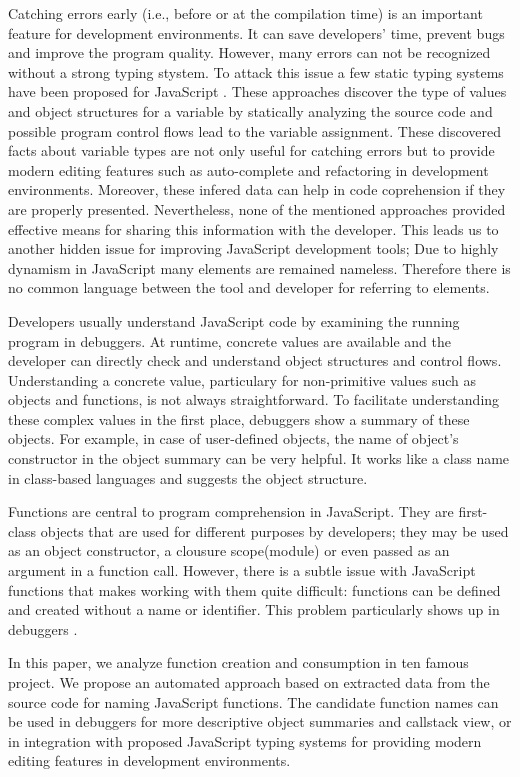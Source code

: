 \documentclass[10pt, preprint]{sigplanconf}
\begin{document}
Catching errors early (i.e., before or at the compilation time) is an important feature for development environments. It can save developers' time, prevent bugs and improve the program quality. However, many errors can not be recognized without a strong typing stystem. To attack this issue a few static typing systems have been proposed for JavaScript \cite{Anderson, Anderson2, Heidegger, Thiemann}. These approaches discover the type of values and object structures for a variable by statically analyzing the source code and possible program control flows lead to the variable assignment. These discovered facts about variable types are not only useful for catching errors but to provide modern editing features such as auto-complete and refactoring in development environments. Moreover, these infered data can help in code coprehension if they are properly presented. Nevertheless, none of the mentioned approaches provided effective means for sharing this information with the developer. This leads us to another hidden issue for improving JavaScript development tools; Due to highly dynamism in JavaScript many elements are remained nameless. Therefore there is no common language between the tool and developer for referring to elements.

Developers usually understand JavaScript code by examining the running program in debuggers. At runtime, concrete values are available and the developer can directly check and understand object structures and control flows. Understanding a concrete value, particulary for non-primitive values such as objects and functions, is not always straightforward. To facilitate understanding these complex values in the first place, debuggers show a summary of these objects. For example, in case of user-defined objects, the name of object's constructor in the object summary can be very helpful. It works like a class name in class-based languages and suggests the object structure.

Functions are central to program comprehension in JavaScript. They are first-class objects that are used for different purposes by developers; they may be used as an object constructor, a clousure scope(module) or even  passed as an argument in a function call. However, there is a subtle issue with JavaScript functions that makes working with them quite difficult: functions can be defined and created without a name or identifier. This problem particularly shows up in debuggers \cite{Zaytsev}. 


In this paper, we analyze function creation and consumption in ten famous project. We propose an automated approach based on extracted data from the source code for naming JavaScript functions. The candidate function names can be used in debuggers for more descriptive object summaries and callstack view, or in integration with proposed JavaScript typing systems for providing modern editing features in development environments. 
\end{document}
